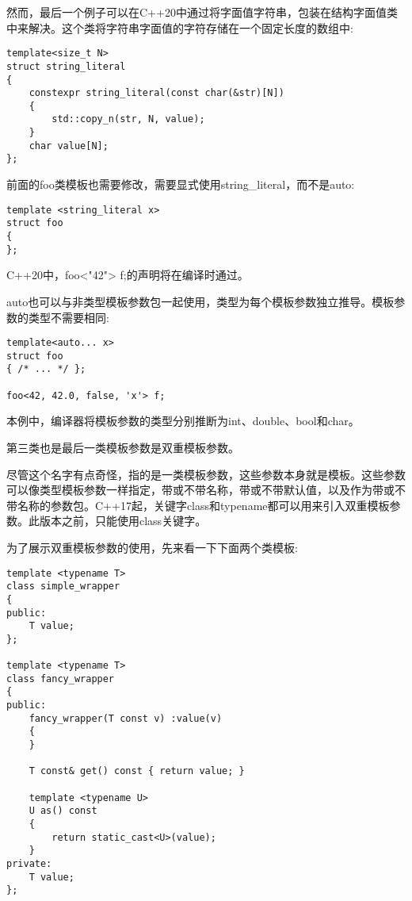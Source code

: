 然而，最后一个例子可以在C++20中通过将字面值字符串，包装在结构字面值类中来解决。这个类将字符串字面值的字符存储在一个固定长度的数组中:

\begin{lstlisting}[style=styleCXX]
template<size_t N>
struct string_literal
{
	constexpr string_literal(const char(&str)[N])
	{
		std::copy_n(str, N, value);
	}
	char value[N];
};
\end{lstlisting}

前面的foo类模板也需要修改，需要显式使用string\_literal，而不是auto:

\begin{lstlisting}[style=styleCXX]
template <string_literal x>
struct foo
{
};
\end{lstlisting}

C++20中，foo<"42"> f;的声明将在编译时通过。

auto也可以与非类型模板参数包一起使用，类型为每个模板参数独立推导。模板参数的类型不需要相同:

\begin{lstlisting}[style=styleCXX]
template<auto... x>
struct foo
{ /* ... */ };

foo<42, 42.0, false, 'x'> f;
\end{lstlisting}

本例中，编译器将模板参数的类型分别推断为int、double、bool和char。

第三类也是最后一类模板参数是双重模板参数。


尽管这个名字有点奇怪，指的是一类模板参数，这些参数本身就是模板。这些参数可以像类型模板参数一样指定，带或不带名称，带或不带默认值，以及作为带或不带名称的参数包。C++17起，关键字class和typename都可以用来引入双重模板参数。此版本之前，只能使用class关键字。

为了展示双重模板参数的使用，先来看一下下面两个类模板:

\begin{lstlisting}[style=styleCXX]
template <typename T>
class simple_wrapper
{
public:
	T value;
};

template <typename T>
class fancy_wrapper
{
public:
	fancy_wrapper(T const v) :value(v)
	{
	}

	T const& get() const { return value; }
	
	template <typename U>
	U as() const
	{
		return static_cast<U>(value);
	}
private:
	T value;
};
\end{lstlisting}

